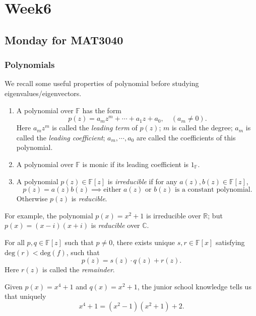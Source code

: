 \chapter{Week6}
\section{Monday for MAT3040}

\subsection{Polynomials}
We recall some useful properties of polynomial before studying eigenvalues/eigenvectors.
\begin{definition}[Polynomial]
\begin{enumerate}
\item
A polynomial over $\mathbb{F}$ has the form
\[
p(z)=a_mz^m+\cdots+a_1z+a_0,\quad (a_m\ne0).
\]
Here $a_mz^m$ is called the \emph{leading term} of $p(z)$; $m$ is called the degree; $a_m$ is called the \emph{leading coefficient}; $a_m,\cdots,a_0$ are called the coefficients of this polynomial.
\item
A polynomial over $\mathbb{F}$ is monic if its leading coefficient is $1_{\mathbb{F}}.$
\item
A polynomial $p(z)\in\mathbb{F}[z]$ is \emph{irreducible} if for any $a(z),b(z)\in\mathbb{F}[z]$, 
\[
p(z)=a(z)b(z)\implies
\text{either $a(z)$ or $b(z)$ is a constant polynomial}.
\]
Otherwise $p(z)$ is \emph{reducible}.
\end{enumerate}
\end{definition}
\begin{example}
For example, the polynomial $p(x)=x^2+1$ is irreducible over $\mathbb{R}$; but $p(x) = (x-i)(x+i)$ is \emph{reducible} over $\mathbb{C}$.
\end{example}

\begin{theorem}
For all $p,q\in\mathbb{F}[z]$ such that $p\ne0$, there exists unique $s,r\in\mathbb{F}[x]$ satisfying $\text{deg}(r)<\text{deg}(f)$, such that 
\[
p(z)=s(z)\cdot q(z)+r(z).
\]
Here $r(z)$ is called the \emph{remainder}.
\end{theorem}


\begin{example}
Given $p(x)=x^4+1$ and $q(x)=x^2+1$, the junior school knowledge tells us that uniquely
\[
x^4+1 = (x^2-1)(x^2+1)+2.
\]
\end{example}

